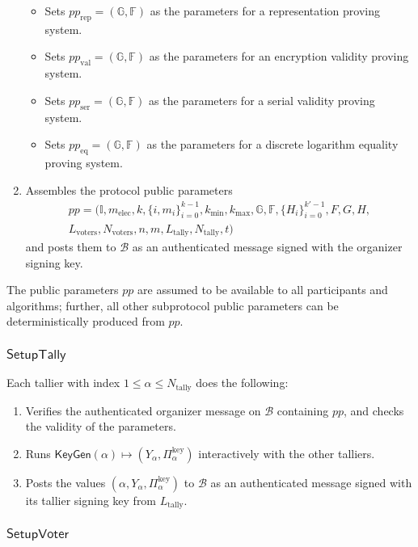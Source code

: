 \documentclass{article}
\newcommand{\G}{\mathbb{G}}
\newcommand{\F}{\mathbb{F}}
\newcommand{\func}[1]{\mathsf{#1}}
\begin{document}
\begin{enumerate}
\begin{itemize}
\item Sets $pp_{\text{rep}} = (\G, \F)$ as the parameters for a representation proving system.
\item Sets $pp_{\text{val}} = (\G, \F)$ as the parameters for an encryption validity proving system.
\item Sets $pp_{\text{ser}} = (\G, \F)$ as the parameters for a serial validity proving system.
\item Sets $pp_{\text{eq}} = (\G, \F)$ as the parameters for a discrete logarithm equality proving system.
\end{itemize}
\item Assembles the protocol public parameters
\begin{multline*}
    pp = (\mathbb{I}, m_{\text{elec}}, k, \{i,m_i\}_{i=0}^{k-1}, k_{\text{min}}, k_{\text{max}}, \G, \F, \{H_i\}_{i=0}^{k'-1}, F, G, H, \\
    L_{\text{voters}}, N_{\text{voters}}, n, m, L_{\text{tally}}, N_{\text{tally}}, t)
\end{multline*}
and posts them to $\mathcal{B}$ as an authenticated message signed with the organizer signing key.
\end{enumerate}

The public parameters $pp$ are assumed to be available to all participants and algorithms; further, all other subprotocol public parameters can be deterministically produced from $pp$.


\subsubsection{\texorpdfstring{$\func{SetupTally}$}{SetupTally}}

Each tallier with index $1 \leq \alpha \leq N_{\text{tally}}$ does the following:
\begin{enumerate}
\item Verifies the authenticated organizer message on $\mathcal{B}$ containing $pp$, and checks the validity of the parameters.
\item Runs $\func{KeyGen}(\alpha) \mapsto (Y_\alpha, \Pi_\alpha^{\text{key}})$ interactively with the other talliers.
\item Posts the values $(\alpha, Y_\alpha, \Pi_\alpha^{\text{key}})$ to $\mathcal{B}$ as an authenticated message signed with its tallier signing key from $L_{\text{tally}}$.
\end{enumerate}


\subsubsection{\texorpdfstring{$\func{SetupVoter}$}{SetupVoter}}
\end{document}
